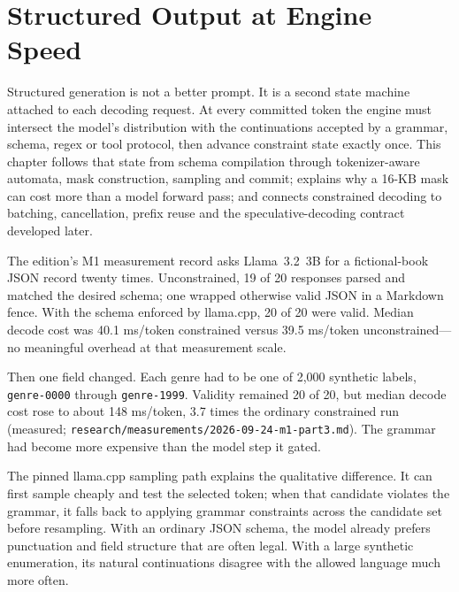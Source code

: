 \chapter{Structured Output at Engine Speed}\label{ch:structured-output}

\begin{ChapterIntent}
Structured generation is not a better prompt. It is a second state machine attached
to each decoding request. At every committed token the engine must intersect the
model's distribution with the continuations accepted by a grammar, schema, regex or
tool protocol, then advance constraint state exactly once. This chapter follows that
state from schema compilation through tokenizer-aware automata, mask construction,
sampling and commit; explains why a 16-KB mask can cost more than a model forward
pass; and connects constrained decoding to batching, cancellation, prefix reuse and
the speculative-decoding contract developed later.
\end{ChapterIntent}


The edition's M1 measurement record asks Llama~3.2~3B for a fictional-book JSON
record twenty times. Unconstrained, 19 of 20 responses parsed and matched the desired
schema; one wrapped otherwise valid JSON in a Markdown fence. With the schema enforced
by llama.cpp, 20 of 20 were valid. Median decode cost was 40.1 ms/token constrained
versus 39.5 ms/token unconstrained---no meaningful overhead at that measurement scale.

Then one field changed. Each genre had to be one of 2,000 synthetic labels,
\texttt{genre-0000} through \texttt{genre-1999}. Validity remained 20 of 20, but
median decode cost rose to about 148 ms/token, 3.7 times the ordinary constrained run
(measured; \texttt{research/measurements/2026-09-24-m1-part3.md}). The grammar had
become more expensive than the model step it gated.

The pinned llama.cpp sampling path explains the qualitative difference. It can first
sample cheaply and test the selected token; when that candidate violates the grammar,
it falls back to applying grammar constraints across the candidate set before
resampling. With an ordinary JSON schema, the model already prefers punctuation and
field structure that are often legal. With a large synthetic enumeration, its natural
continuations disagree with the allowed language much more often.

